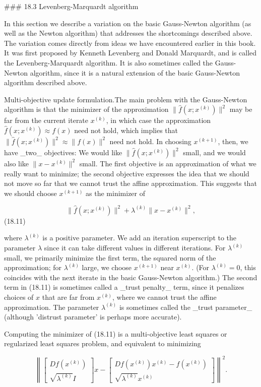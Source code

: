 

### 18.3 Levenberg-Marquardt algorithm

In this section we describe a variation on the basic Gauss-Newton algorithm (as well as the Newton algorithm) that addresses the shortcomings described above. The variation comes directly from ideas we have encountered earlier in this book. It was first proposed by Kenneth Levenberg and Donald Marquardt, and is called the Levenberg-Marquardt algorithm. It is also sometimes called the Gauss-Newton algorithm, since it is a natural extension of the basic Gauss-Newton algorithm described above.

Multi-objective update formulation.The main problem with the Gauss-Newton algorithm is that the minimizer of the approximation \(\|\hat{f}(x;x^{(k)})\|^{2}\) may be far from the current iterate \(x^{(k)}\), in which case the approximation \(\hat{f}(x;x^{(k)})\approx f(x)\) need not hold, which implies that \(\|\hat{f}(x;x^{(k)})\|^{2}\approx\|f(x)\|^{2}\) need not hold. In choosing \(x^{(k+1)}\), then, we have _two_ objectives: We would like \(\|\hat{f}(x;x^{(k)})\|^{2}\) small, and we would also like \(\|x-x^{(k)}\|^{2}\) small. The first objective is an approximation of what we really want to minimize; the second objective expresses the idea that we should not move so far that we cannot trust the affine approximation. This suggests that we should choose \(x^{(k+1)}\) as the minimizer of

\[\|\hat{f}(x;x^{(k)})\|^{2}+\lambda^{(k)}\|x-x^{(k)}\|^{2},\] (18.11)

where \(\lambda^{(k)}\) is a positive parameter. We add an iteration superscript to the parameter \(\lambda\) since it can take different values in different iterations. For \(\lambda^{(k)}\) small, we primarily minimize the first term, the squared norm of the approximation; for \(\lambda^{(k)}\) large, we choose \(x^{(k+1)}\) near \(x^{(k)}\). (For \(\lambda^{(k)}=0\), this coincides with the next iterate in the basic Gauss-Newton algorithm.) The second term in (18.11) is sometimes called a _trust penalty_ term, since it penalizes choices of \(x\) that are far from \(x^{(k)}\), where we cannot trust the affine approximation. The parameter \(\lambda^{(k)}\) is sometimes called the _trust parameter_ (although 'distrust parameter' is perhaps more accurate).

Computing the minimizer of (18.11) is a multi-objective least squares or regularized least squares problem, and equivalent to minimizing

\[\left\|\left[\begin{array}{c}Df(x^{(k)})\\ \sqrt{\lambda^{(k)}}I\end{array}\right]x-\left[\begin{array}{c}Df(x^{(k)})x ^{(k)}-f(x^{(k)})\\ \sqrt{\lambda^{(k)}}x^{(k)}\end{array}\right]\right\|^{2}.\]

